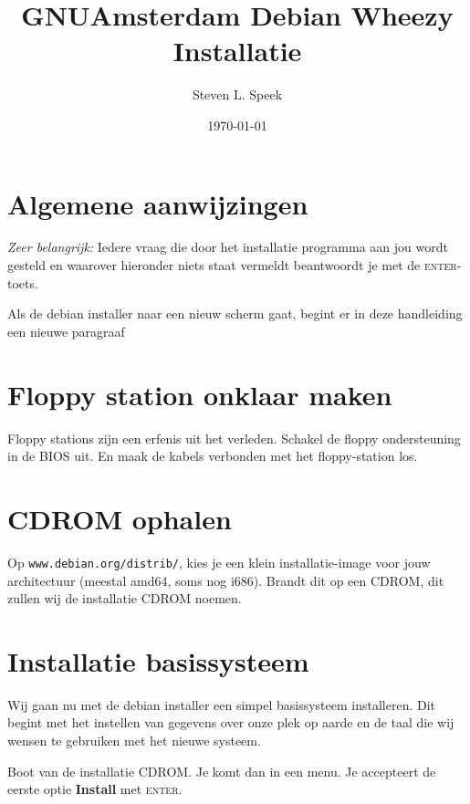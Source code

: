 \documentclass[12pt,a4paper]{article}
\begin{document}
\graphicspath{ {./images/} }
\lstset{language=bash}      
\author{Steven L. Speek}
\title{GNUAmsterdam Debian Wheezy Installatie}
\date{\today}
\maketitle
{}
\section{Algemene aanwijzingen}
\emph{Zeer belangrijk:} Iedere vraag die door het installatie programma aan jou wordt gesteld en waarover hieronder niets staat vermeldt beantwoordt je met de \textsc{enter}-toets.

Als de debian installer naar een nieuw scherm gaat, begint er in deze handleiding een nieuwe paragraaf
\section{Floppy station onklaar maken}
Floppy stations zijn een erfenis uit het verleden. Schakel de floppy ondersteuning in de BIOS uit. En maak de kabels verbonden met het floppy-station los.
\section{CDROM ophalen}
Op \texttt{www.debian.org/distrib/}, kies je een klein installatie-image voor jouw architectuur (meestal amd64, soms nog i686).
Brandt dit op een CDROM, dit zullen wij de installatie CDROM noemen.


\section{Installatie basissysteem}
Wij gaan nu met de debian installer een simpel basissysteem installeren. Dit begint met het instellen van gegevens over onze plek op aarde en de taal die wij wensen te gebruiken met het nieuwe systeem.

Boot van de installatie CDROM. Je komt dan in een menu.
Je accepteert de eerste optie \textbf{Install} met \textsc{enter}.
\end{document}
